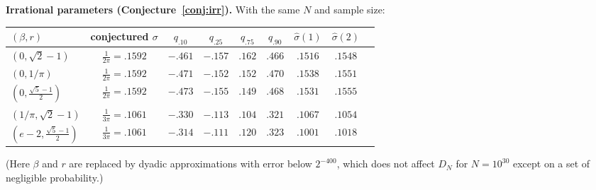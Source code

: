 \documentclass[11pt]{amsart}
\theoremstyle{definition}
\numberwithin{equation}{section}
\begin{document}
\smallskip\noindent\textbf{Irrational parameters (Conjecture~\ref{conj:irr}).} With the same $N$ and sample size:
\begin{center}\small
\begin{tabular}{lcccccccc}\toprule
$(\beta,r)$ & conjectured $\sigma$ & $q_{.10}$ & $q_{.25}$ & $q_{.75}$ & $q_{.90}$ & $\hat\sigma(1)$ & $\hat\sigma(2)$\\\midrule
$(0,\sqrt2-1)$ & $\frac1{2\pi}=.1592$ & $-.461$ & $-.157$ & $.162$ & $.466$ & $.1516$ & $.1548$\\
$(0,1/\pi)$ & $\frac1{2\pi}=.1592$ & $-.471$ & $-.152$ & $.152$ & $.470$ & $.1538$ & $.1551$\\
$(0,\frac{\sqrt5-1}2)$ & $\frac1{2\pi}=.1592$ & $-.473$ & $-.155$ & $.149$ & $.468$ & $.1531$ & $.1555$\\
$(1/\pi,\sqrt2-1)$ & $\frac1{3\pi}=.1061$ & $-.330$ & $-.113$ & $.104$ & $.321$ & $.1067$ & $.1054$\\
$(e-2,\frac{\sqrt5-1}2)$ & $\frac1{3\pi}=.1061$ & $-.314$ & $-.111$ & $.120$ & $.323$ & $.1001$ & $.1018$\\\bottomrule
\end{tabular}
\end{center}
(Here $\beta$ and $r$ are replaced by dyadic approximations with error below $2^{-400}$, which does not affect $D_N$ for $N=10^{30}$ except on a set of
negligible probability.)
\end{document}
